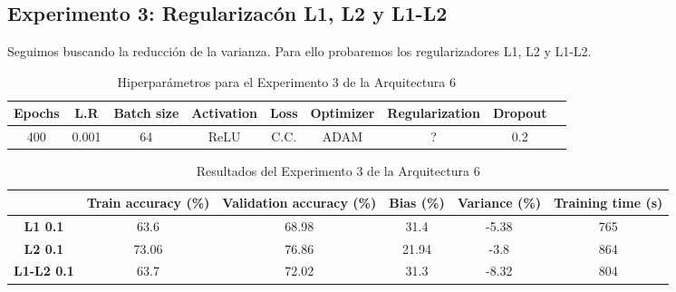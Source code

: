 \documentclass{article}
\begin{document}
        \subsection{Experimento 3: Regularizac\'on L1, L2 y L1-L2 }
        Seguimos buscando la reducci\'on de la varianza. Para ello probaremos los regularizadores L1, L2 y L1-L2. 


      
        \begin{table}[!h]
				\begin{tabular}{|c|c|c|c|c|c|c|c|c|}
					\textbf{Epochs}&\textbf{L.R}&\textbf{Batch size}&\textbf{Activation}&\textbf{Loss}&\textbf{Optimizer}&\textbf{Regularization}&\textbf{Dropout}   \\ \hline
					400 & 0.001 & 64 & ReLU & C.C. & ADAM & ? & 0.2 
				\end{tabular}
				\caption{Hiperpar\'ametros para el Experimento 3 de la Arquitectura 6}
				\label{tab:hip-a6-e2}
			\end{table}

    
   
   \begin{table}[!h]
				\begin{center}
					\begin{tabular}{ c | c | c | c | c | c |}
						\ & \textbf{Train accuracy (\%)} & \textbf{Validation accuracy (\%)} & \textbf{Bias (\%)} & \textbf{Variance (\%)} & \textbf{Training time (s)} \\ \hline
						\textbf{L1 0.1} &63.6   &68.98  & 31.4  & -5.38 &  765 \\ \hline
						\textbf{L2 0.1} & 73.06   & 76.86 &  21.94 & -3.8 &864   \\ \hline
                        \textbf{L1-L2 0.1} &  63.7  &72.02 &  31.3 & -8.32 &804   \\ \hline
					\end{tabular}
					\caption{Resultados del Experimento 3 de la Arquitectura 6}
					\label{tab:res-a2-e5}
				\end{center}
			\end{table}
   
\end{document}
